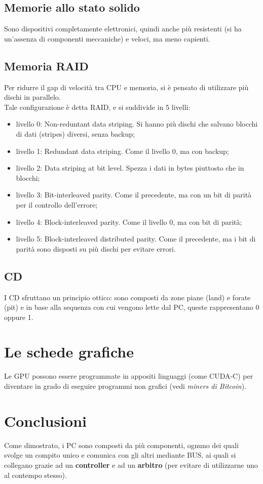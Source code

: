 \documentclass[12pt]{article}
\begin{document}
\subsection{Memorie allo stato solido}
Sono dispositivi completamente elettronici, quindi anche più resistenti (si ha un'assenza di componenti meccaniche) e veloci, ma meno capienti.
\pagebreak
\subsection{Memoria RAID}
Per ridurre il gap di velocità tra CPU e memoria, si è pensato di utilizzare più dischi in parallelo.\\
Tale configurazione è detta RAID, e si suddivide in 5 livelli:
\begin{itemize}
    \item livello 0: Non-reduntant data striping. Si hanno più dischi che salvano blocchi di dati (stripes) diversi, senza backup;
    \item livello 1: Redundant data striping. Come il livello 0, ma con backup;
    \item livello 2: Data striping at bit level. Spezza i dati in bytes piuttosto che in blocchi;
    \item livello 3: Bit-interleaved parity. Come il precedente, ma con un bit di parità per il controllo dell'errore;
    \item livello 4: Block-interleaved parity. Come il livello 0, ma con bit di parità;
    \item livello 5: Block-interleaved distributed parity. Come il precedente, ma i bit di parità sono disposti su più dischi per evitare errori.
\end{itemize}
\subsection{CD}
I CD sfruttano un principio ottico: sono composti da zone piane (land) e forate (pit) e in base alla sequenza con cui vengono lette dal PC, queste rappresentano 0 oppure 1.
\section{Le schede grafiche}
Le GPU possono essere programmate in appositi linguaggi (come CUDA-C) per diventare in grado di eseguire programmi non grafici (vedi \textit{miners di Bitcoin}).
\section{Conclusioni}
Come dimostrato, i PC sono composti da più componenti, ognuno dei quali svolge un compito unico e comunica con gli altri mediante BUS, ai quali si collegano grazie ad un \textbf{controller} e ad un \textbf{arbitro} (per evitare di utilizzarne uno al contempo stesso).
\end{document}
